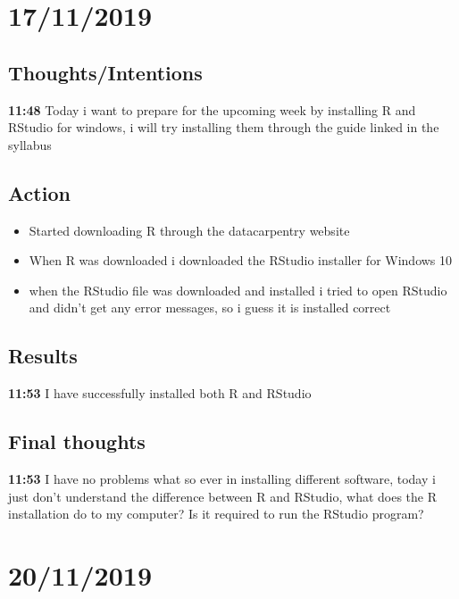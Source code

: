 \documentclass{article}
\begin{document}
\section{17/11/2019}
\subsection{Thoughts/Intentions}
\textbf{11:48} Today i want to prepare for the upcoming week by installing R and RStudio for windows, i will try installing them through the guide linked in the syllabus
\subsection{Action}
\begin{itemize}
    \item Started downloading R through the datacarpentry website 
    \item When R was downloaded i downloaded the RStudio installer for Windows 10 
    \item when the RStudio file was downloaded and installed i tried to open RStudio and didn't get any error messages, so i guess it is installed correct
\end{itemize}
\subsection{Results}
\textbf{11:53} I have successfully installed both R and RStudio

\subsection{Final thoughts}
\textbf{11:53} I have no problems what so ever in installing different software, today i just don't understand the difference between R and RStudio, what does the R installation do to my computer? Is it required to run the RStudio program?

\section{20/11/2019}
\end{document}
